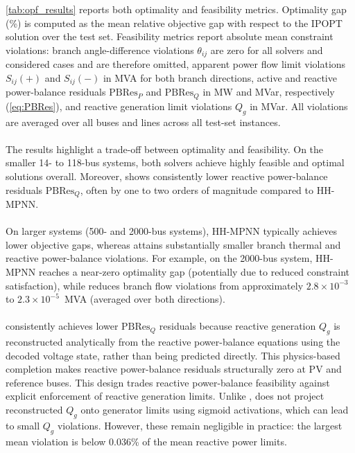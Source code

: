 \cref{tab:opf_results} reports both optimality and feasibility metrics. Optimality gap (\%) is computed as the mean relative objective gap with respect to the IPOPT solution over the test set. Feasibility metrics report absolute mean constraint violations: branch angle-difference violations $\theta_{ij}$ are zero for all solvers and considered cases and are therefore omitted, apparent power flow limit violations $S_{ij}(+)$ and $S_{ij}(-)$ in MVA for both branch directions, active and reactive power-balance residuals $\mathrm{PBRes}_{P}$ and $\mathrm{PBRes}_{Q}$ in MW and MVar, respectively (\cref{eq:PBRes}), and reactive generation limit violations $Q_g$ in MVar. All violations are averaged over all buses and lines across all test-set instances.
\\\\
The results highlight a trade-off between optimality and feasibility. On the smaller 14- to 118-bus systems, both solvers achieve highly feasible and optimal solutions overall. Moreover, \genco shows consistently lower reactive power-balance residuals $\mathrm{PBRes}_{Q}$, often by one to two orders of magnitude compared to HH-MPNN.
\\\\
On larger systems (500- and 2000-bus systems), HH-MPNN typically achieves lower objective gaps, whereas \genco attains substantially smaller branch thermal and reactive power-balance violations. For example, on the 2000-bus system, HH-MPNN reaches a near-zero optimality gap (potentially due to reduced constraint satisfaction), while \genco reduces branch flow violations from approximately $2.8 \times 10^{-3}$ to $2.3 \times 10^{-5}$~MVA (averaged over both directions).
\\\\
\genco consistently achieves lower $\mathrm{PBRes}_{Q}$ residuals because reactive generation $Q_g$ is reconstructed analytically from the reactive power-balance equations using the decoded voltage state, rather than being predicted directly. This physics-based completion makes reactive power-balance residuals structurally zero at PV and reference buses. This design trades reactive power-balance feasibility against explicit enforcement of reactive generation limits. Unlike \cite{arowolo2025}, \genco does not project reconstructed $Q_g$ onto generator limits using sigmoid activations, which can lead to small $Q_g$ violations. However, these remain negligible in practice: the largest mean violation is below 0.036\% of the mean reactive power limits.
\\\\
